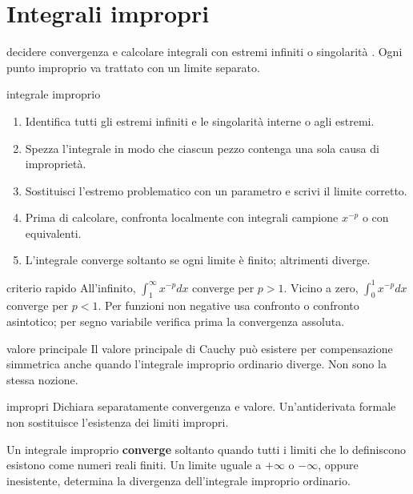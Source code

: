 \chapter{Integrali impropri}
\label{chap:16}

\begin{obiettivocapitolo}{decidere convergenza e calcolare integrali con estremi infiniti o singolarità}
\prioritaalta. Ogni punto improprio va trattato con un limite separato.
\end{obiettivocapitolo}
\begin{proceduraesame}{integrale improprio}
\begin{enumerate}
\item Identifica tutti gli estremi infiniti e le singolarità interne o agli estremi.
\item Spezza l'integrale in modo che ciascun pezzo contenga una sola causa di improprietà.
\item Sostituisci l'estremo problematico con un parametro e scrivi il limite corretto.
\item Prima di calcolare, confronta localmente con integrali campione $x^{-p}$ o con equivalenti.
\item L'integrale converge soltanto se ogni limite è finito; altrimenti diverge.
\end{enumerate}
\end{proceduraesame}
\begin{sceltametodo}{criterio rapido}
All'infinito, $\int_1^\infty x^{-p}dx$ converge per $p>1$. Vicino a zero, $\int_0^1 x^{-p}dx$ converge per $p<1$. Per funzioni non negative usa confronto o confronto asintotico; per segno variabile verifica prima la convergenza assoluta.
\end{sceltametodo}
\begin{errorefrequente}{valore principale}
Il valore principale di Cauchy può esistere per compensazione simmetrica anche quando l'integrale improprio ordinario diverge. Non sono la stessa nozione.
\end{errorefrequente}
\begin{controllofinale}{impropri}
Dichiara separatamente convergenza e valore. Un'antiderivata formale non sostituisce l'esistenza dei limiti impropri.
\end{controllofinale}

Un integrale improprio \textbf{converge} soltanto quando tutti i limiti che lo definiscono esistono come numeri reali finiti. Un limite uguale a \(+\infty\) o \(-\infty\), oppure inesistente, determina la divergenza dell'integrale improprio ordinario.

